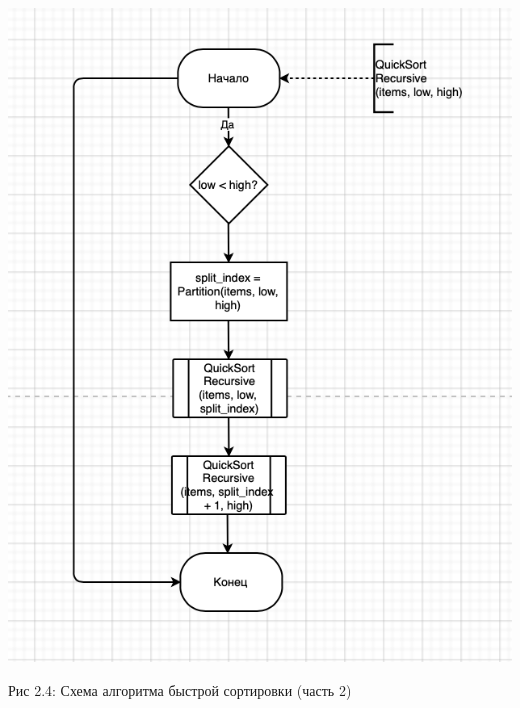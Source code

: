 \documentclass[12pt]{report}
\begin{document}
\begin{center}
		\includegraphics[scale=1.1]{schema/QuickSortRec.png}
		
			Рис 2.4: Схема алгоритма быстрой сортировки (часть 2)
\end{center}
\end{document}

